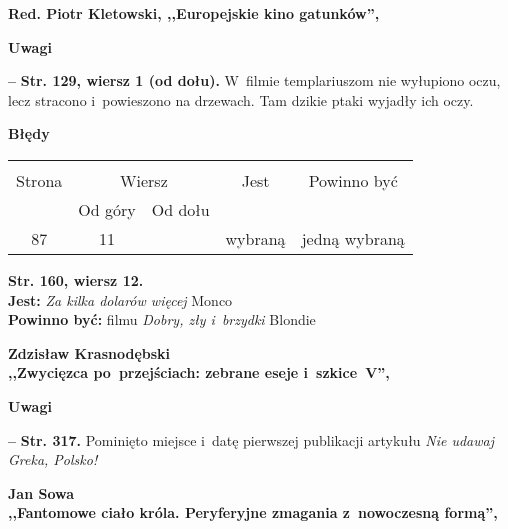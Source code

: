 \documentclass[a4paper]{article}
\newcommand{\spaceTwo}{2em}
\newcommand{\tb}{\textbf}
\newcommand{\noi}{\noindent}
\newcommand{\start}{\noi \tb{--} {}}
\newcommand{\Str}[1]{\tb{Str. #1.}}
\newcommand{\StrWg}[2]{\tb{Str. #1, wiersz #2.}}
\newcommand{\StrWd}[2]{\tb{Str. #1, wiersz #2 (od dołu).}}
\newcommand{\Center}[1]{\begin{center} #1 \end{center}}
\newcommand{\CenterTB}[1]{\Center{\tb{#1}}}
\newcommand{\Jest}{\tb{Jest: }}
\newcommand{\Pow}{\tb{Powinno być: }}
\newcommand{\Work}[1]{ \begin{center} {\large \tb{#1}} \end{center} }
\begin{document}
\vspace{\spaceTwo}





\Work{
  Red. Piotr Kletowski,
  ,,Europejskie kino gatunków'', \cite{RedKletowski16}}


\CenterTB{Uwagi}

\start \StrWd{129}{1} W~filmie templariuszom nie wyłupiono oczu, lecz stracono i~powieszono na drzewach. Tam dzikie ptaki wyjadły ich oczy.

\CenterTB{Błędy}
\begin{center}
  \begin{tabular}{|c|c|c|c|c|}
    \hline
    & \multicolumn{2}{c|}{} & & \\
    Strona & \multicolumn{2}{c|}{Wiersz}& Jest & Powinno być \\ \cline{2-3}
    & Od góry & Od dołu &  &  \\ \hline
    87 & 11 & & wybraną & jedną wybraną \\
    \hline
  \end{tabular}
\end{center}
\noi
\StrWg{160}{12} \\
\Jest \emph{Za kilka dolarów więcej} Monco \\
\Pow filmu \emph{Dobry, zły i~brzydki} Blondie \\

\vspace{\spaceTwo}





\Work{
  Zdzisław Krasnodębski \\
  ,,Zwycięzca po~przejściach: zebrane eseje i~szkice~V'',
  \cite{Krasnodebski12} }


\CenterTB{Uwagi}

\start \Str{317} Pominięto miejsce i~datę pierwszej publikacji
artykułu \emph{Nie udawaj Greka, Polsko!}

\vspace{\spaceTwo}





\Work{
  Jan Sowa \\
  ,,Fantomowe ciało króla. Peryferyjne zmagania z~nowoczesną formą'',
  \cite{Sowa11} }
\end{document}
